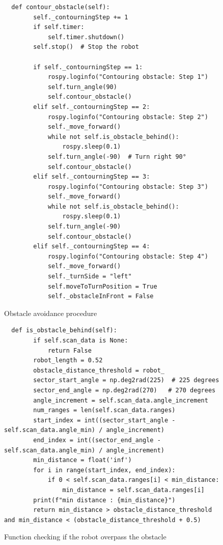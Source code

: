 \documentclass[a4paper,12pt]{extreport}
\begin{document}
\begin{figure}
  \begin{verbatim}
  def contour_obstacle(self):
        self._contourningStep += 1 
        if self.timer:
            self.timer.shutdown()  
        self.stop()  # Stop the robot
        
        if self._contourningStep == 1:
            rospy.loginfo("Contouring obstacle: Step 1")
            self.turn_angle(90)  
            self.contour_obstacle()
        elif self._contourningStep == 2:
            rospy.loginfo("Contouring obstacle: Step 2")
            self._move_forward()  
            while not self.is_obstacle_behind():
                rospy.sleep(0.1)
            self.turn_angle(-90)  # Turn right 90°
            self.contour_obstacle()
        elif self._contourningStep == 3:
            rospy.loginfo("Contouring obstacle: Step 3")
            self._move_forward()  
            while not self.is_obstacle_behind():
                rospy.sleep(0.1)
            self.turn_angle(-90)  
            self.contour_obstacle()
        elif self._contourningStep == 4:
            rospy.loginfo("Contouring obstacle: Step 4")
            self._move_forward()  
            self._turnSide = "left"
            self.moveToTurnPosition = True
            self._obstacleInFront = False
\end{verbatim}
\caption{Obstacle avoidance procedure}
\end{figure}
\label{judFig26}
\begin{figure}
  \begin{verbatim}
  def is_obstacle_behind(self):
        if self.scan_data is None:
            return False  
        robot_length = 0.52  
        obstacle_distance_threshold = robot_
        sector_start_angle = np.deg2rad(225)  # 225 degrees
        sector_end_angle = np.deg2rad(270)   # 270 degrees
        angle_increment = self.scan_data.angle_increment
        num_ranges = len(self.scan_data.ranges)
        start_index = int((sector_start_angle - self.scan_data.angle_min) / angle_increment)
        end_index = int((sector_end_angle - self.scan_data.angle_min) / angle_increment)
        min_distance = float('inf')
        for i in range(start_index, end_index):
            if 0 < self.scan_data.ranges[i] < min_distance:
                min_distance = self.scan_data.ranges[i]
        print(f"min distance : {min_distance}")
        return min_distance > obstacle_distance_threshold and min_distance < (obstacle_distance_threshold + 0.5)
\end{verbatim}
\caption{Function checking if the robot overpass the obstacle}
\end{figure}
\end{document}
